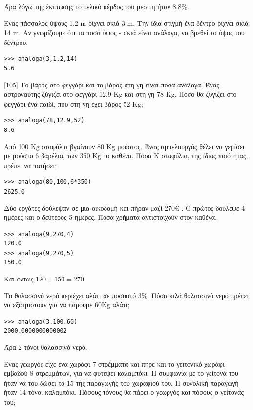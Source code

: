 Άρα λόγω της έκπτωσης το τελικό κέρδος του μεσίτη ήταν 8.8\%.
\begin{exercise}
Ένας	πάσσαλος	ύψους	1,2	m	ρίχνει	σκιά	3	m.	Την	ίδια	στιγμή	ένα	δέντρο	ρίχνει	σκιά	14	m.	Αν	γνωρίζουμε	ότι	τα	ποσά	ύψος	-	σκιά	είναι	ανάλογα,	να	βρεθεί	το	ύψος	του	δέντρου.
\end{exercise}
\begin{lstlisting}
>>> analoga(3,1.2,14)
5.6
\end{lstlisting}
\begin{exercise}
[105]
Το	βάρος	στο	φεγγάρι	και	το	βάρος	στη	γη	είναι	ποσά	ανάλογα.	Ένας	αστροναύτης	ζύγιζει	στο	φεγγάρι	12,9	Kg	και	στη	γη	78	Kg.	Πόσο	θα	ζυγίζει	στο	φεγγάρι	ένα	παιδί,	που 	στη	γη	έχει	βάρος	52	Kg;
\end{exercise}
\begin{lstlisting}
>>> analoga(78,12.9,52)
8.6
\end{lstlisting}
\begin{exercise}
Aπό	100	Kg	σταφύλια	βγαίνουν	80	Kg	μούστος.	Ένας	αμπελουργός	θέλει	να	γεμίσει	με	μούστο	6	βαρέλια,	των	350	Kg	το	καθένα.	Πόσα	K	σταφύλια,	της	ίδιας	ποιότητας,	πρέπει	να	πατήσει;
\end{exercise}
\begin{lstlisting}
>>> analoga(80,100,6*350)
2625.0
\end{lstlisting}
\begin{exercise}
Δύο	εργάτες	δούλεψαν	σε	μια	οικοδομή	και	πήραν	μαζί	270€ .	O	πρώτος	δούλεψε	4	ημέρες	και	ο	δεύτερος	5	ημέρες.	Πόσα	χρήματα	αντιστοιχούν	στον	καθένα.
\end{exercise}
\begin{lstlisting}
>>> analoga(9,270,4)
120.0
>>> analoga(9,270,5)
150.0
\end{lstlisting}
Και όντως $120+150=270$.
\begin{exercise}
Το	θαλασσινό	νερό	περιέχει	αλάτι	σε	ποσοστό	3\%.	Πόσα	κιλά	θαλασσινό	νερό	πρέπει	να	εξατμιστούν	για	να	πάρουμε	60Kg	αλάτι;
\end{exercise}
\begin{lstlisting}
>>> analoga(3,100,60)
2000.0000000000002
\end{lstlisting}
Άρα 2 τόνοι θαλασσινό νερό.
\begin{exercise}
Ένας	γεωργός	είχε	ένα	χωράφι	7	στρέμματα	και	πήρε	και	το	γειτονικό	χωράφι	εμβαδού	8	στρεμμάτων,	για	να	φυτέψει	καλαμπόκι.	Η	συμφωνία	με	το	γείτονά	του	ήταν	να	του	δώσει	το	15	της	παραγωγής	του	χωραφιού	του.	Η	συνολική	παραγωγή	ήταν	14	τόνοι	καλαμπόκι.	Πόσους	τόνους	θα	πάρει	ο	γεωργός	και	πόσους	ο	γείτονάς	του;
\end{exercise}
